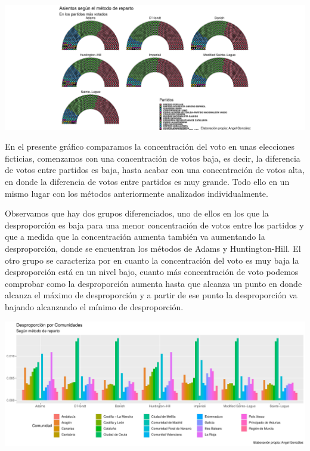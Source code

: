 \documentclass[12pt,a4paper,]{book}
\numberwithin{dummy}{section}
\theoremstyle{ocrenumbox}
\theoremstyle{blacknumex}
\theoremstyle{blacknumbox}
\theoremstyle{ocrenum}
\theoremstyle{ocrenum}
\begin{document}
\begin{center}\includegraphics[width=0.95\linewidth]{figurasR/unnamed-chunk-65-1} \end{center}

En el presente gráfico comparamos la concentración del voto en unas
elecciones ficticias, comenzamos con una concentración de votos baja, es
decir, la diferencia de votos entre partidos es baja, hasta acabar con
una concentración de votos alta, en donde la diferencia de votos entre
partidos es muy grande. Todo ello en un mismo lugar con los métodos
anteriormente analizados individualmente.

Observamos que hay dos grupos diferenciados, uno de ellos en los que la
desproporción es baja para una menor concentración de votos entre los
partidos y que a medida que la concentración aumenta también va
aumentando la desproporción, donde se encuentran los métodos de Adams y
Huntington-Hill. El otro grupo se caracteriza por en cuanto la
concentración del voto es muy baja la desproporción está en un nivel
bajo, cuanto más concentración de voto podemos comprobar como la
desproporción aumenta hasta que alcanza un punto en donde alcanza el
máximo de desproporción y a partir de ese punto la desproporción va
bajando alcanzando el mínimo de desproporción.

\begin{center}\includegraphics[width=0.95\linewidth]{figurasR/unnamed-chunk-66-1} \end{center}
\end{document}
